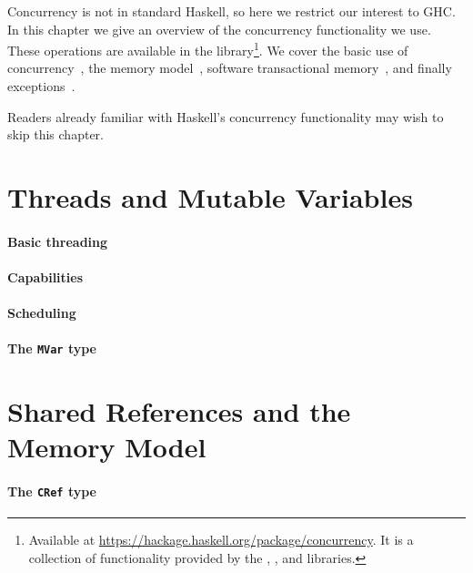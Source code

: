 \chapstart Concurrency is not in standard Haskell, so here we restrict our
interest to GHC.  In this chapter we give an overview of the concurrency
functionality we use.  These operations are available in the
 library\footnote{Available at
\url{https://hackage.haskell.org/package/concurrency}.  It is a collection of
functionality provided by the , , and
 libraries.}.  We cover the basic use of
concurrency~, the memory
model~, software transactional
memory~, and finally
exceptions~.

Readers already familiar with Haskell's concurrency functionality may wish to
skip this chapter.

\section{Threads and Mutable Variables}
\label{sec:concurrent_haskell-threads}

\paragraph{Basic threading}

\paragraph{Capabilities}

\paragraph{Scheduling}

\paragraph{The \texttt{MVar} type}

\section{Shared References and the Memory Model}
\label{sec:concurrent_haskell-mmodel}

\paragraph{The \texttt{CRef} type}

